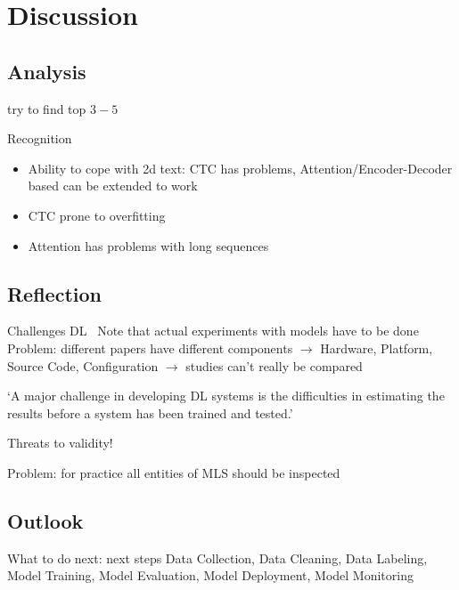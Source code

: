 \chapter{Discussion}\label{ch:discussion}
\section{Analysis}
try to find top $3-5$

Recognition
\begin{itemize}
    \item Ability to cope with 2d text:
        CTC has problems,
        Attention/Encoder-Decoder based can be extended to work
    \item CTC prone to overfitting
    \item Attention has problems with long sequences
\end{itemize}


\section{Reflection}
Challenges DL~\citep{arpteg_software_2018}
Note that actual experiments with models have to be done
Problem: different papers have different components
$\rightarrow$ Hardware, Platform, Source Code, Configuration
$\rightarrow$ studies can't really be compared

`A major challenge in developing DL systems is the difficulties in estimating
the results before a system has been trained and tested.'~\citep{arpteg_software_2018}

Threats to validity!

Problem: for practice all entities of \ac{MLS} should be inspected

\section{Outlook}

What to do next: next steps
Data Collection, Data Cleaning, Data Labeling, Model Training, Model Evaluation, Model Deployment,
Model Monitoring~\cite{watanabe_preliminary_2019}
